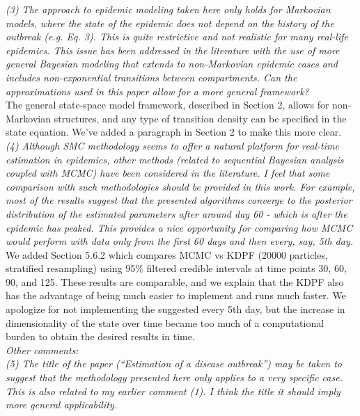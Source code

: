 \documentclass{article}
\begin{document}
\noindent \emph{(3) The approach to epidemic modeling taken here only holds for Markovian models, where the state of the epidemic does not depend on the history of the outbreak (e.g. Eq. 3). This is quite restrictive and not realistic for many real-life epidemics. This issue has been addressed in the literature with the use of more general Bayesian modeling that extends to non-Markovian epidemic cases and includes non-exponential transitions between compartments. Can the approximations used in this paper allow for a more general framework?} \\

The general state-space model framework, described in Section 2, allows for non-Markovian structures, and any type of transition density can be specified in the state equation. We've added a paragraph in Section 2 to make this more clear. \\

\noindent \emph{(4) Although SMC methodology seems to offer a natural platform for real-time estimation in epidemics, other methods (related to sequential Bayesian analysis coupled with MCMC) have been considered in the literature. I feel that some comparison with such methodologies should be provided in this work. For example, most of the results suggest that the presented algorithms converge to the posterior distribution of the estimated parameters after around day 60 - which is after the epidemic has peaked. This provides a nice opportunity for comparing how MCMC would perform with data only from the first 60 days and then every, say, 5th day.} \\

We added Section 5.6.2  which compares MCMC vs KDPF (20000 particles, stratified resampling) using 95\% filtered credible intervals at time points 30, 60, 90, and 125. These results are comparable, and we explain that the KDPF also has the advantage of being much easier to implement and runs much faster. We apologize for not implementing the suggested every 5th day, but the increase in dimensionality of the state over time became too much of a computational burden to obtain the desired results in time. \\

\noindent \emph{Other comments:} \\

\noindent \emph{(5) The title of the paper  (``Estimation of a disease outbreak'') may be taken to suggest that the methodology presented here only applies to a very specific case. This is also related to my earlier comment (1). I think the title  it should imply more general applicability.} \\
\end{document}
